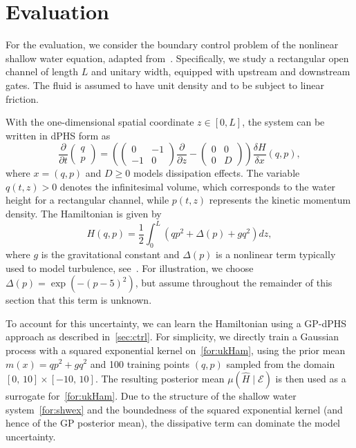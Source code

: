 \documentclass[letterpaper, 10 pt, conference]{ieeeconf}  %
\newcounter{part} %
\begin{document}
\section{Evaluation}
\label{sec:sim}
For the evaluation, we consider the boundary control problem of the nonlinear shallow water equation, adapted from~\cite{macchelli2015control}. Specifically, we study a rectangular open channel of length $L$ and unitary width, equipped with upstream and downstream gates. The fluid is assumed to have unit density and to be subject to linear friction. 

With the one-dimensional spatial coordinate $z \in [0,L]$, the system can be written in dPHS form as
\begin{equation}
\label{for:shwex}
\frac{\partial}{\partial t}
\begin{pmatrix}
q \\
p
\end{pmatrix}
=
\left(
\begin{pmatrix}
0 & -1 \\
-1 & 0
\end{pmatrix}
\frac{\partial}{\partial z}
-
\begin{pmatrix}
0 & 0 \\
0 & D
\end{pmatrix}
\right)
\frac{\delta H}{\delta x}(q,p),
\end{equation}
where $x = (q,p)$ and $D \ge 0$ models dissipation effects. The variable $q(t,z) > 0$ denotes the infinitesimal volume, which corresponds to the water height for a rectangular channel, while $p(t,z)$ represents the kinetic momentum density. The Hamiltonian is given by
\begin{equation}
H(q,p) = \frac{1}{2} \int_0^L \left( q p^2+\Delta(p) + g q^2 \right) dz,\label{for:ukHam}
\end{equation}
where $g$ is the gravitational constant and $\Delta(p)$ is a nonlinear term typically used to model turbulence, see~\cite{pope2001turbulent}. For illustration, we choose $\Delta(p)=\exp(-(p-5)^2)$, but assume throughout the remainder of this section that this term is unknown.

To account for this uncertainty, we can learn the Hamiltonian using a GP-dPHS approach as described in~\cref{sec:ctrl}. For simplicity, we directly train a Gaussian process with a squared exponential kernel on~\cref{for:ukHam}, using the prior mean $m(x)=q p^2 + g q^2$ and 100 training points $(q,p)$ sampled from the domain $[0,\,10]\times [-10,\,10]$. The resulting posterior mean $\mu(\hat{H}\mid\mathcal{E})$ is then used as a surrogate for~\cref{for:ukHam}. Due to the structure of the shallow water system~\cref{for:shwex} and the boundedness of the squared exponential kernel (and hence of the GP posterior mean), the dissipative term can dominate the model uncertainty.
\end{document}
